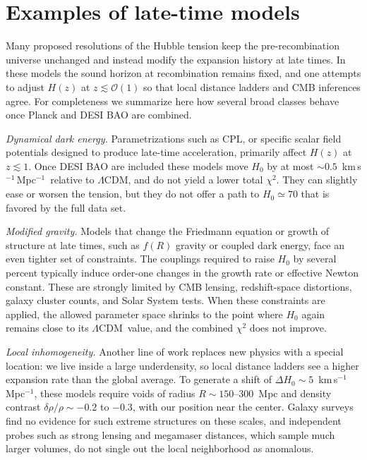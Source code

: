 \documentclass[onecolumn,showpacs,preprintnumbers,amsmath,amssymb,prd]{revtex4-2}
\newcommand{\lcdm}{$\Lambda$CDM}
\newcommand{\kms}{km\,s$^{-1}$\,Mpc$^{-1}$}
\begin{document}


\appendix

\section{Examples of late-time models}
\label{app:latetime}

Many proposed resolutions of the Hubble tension keep the pre-recombination universe 
unchanged and instead modify the expansion history at late times. In these models 
the sound horizon at recombination remains fixed, and one attempts to adjust $H(z)$ 
at $z \lesssim \mathcal{O}(1)$ so that local distance ladders and CMB inferences agree. 
For completeness we summarize here how several broad classes behave once Planck and 
DESI BAO are combined.

\emph{Dynamical dark energy.} Parametrizations such as CPL, or specific scalar 
field potentials designed to produce late-time acceleration, primarily affect 
$H(z)$ at $z \lesssim 1$. Once DESI BAO 
are included these models move $H_0$ by at most $\sim 0.5$~\kms\ 
relative to \lcdm, and do not yield a lower total $\chi^2$. They can slightly ease 
or worsen the tension, but they do not offer a path to $H_0 \simeq 70$ that is 
favored by the full data set.

\emph{Modified gravity.} Models that change the Friedmann equation or growth of 
structure at late times, such as $f(R)$ gravity or coupled dark energy, face an 
even tighter set of constraints. The couplings required to raise $H_0$ by several 
percent typically induce order-one changes in the growth rate or effective Newton 
constant. These are strongly limited by CMB lensing, redshift-space distortions, 
galaxy cluster counts, and Solar System tests. When these constraints are applied, 
the allowed parameter space shrinks to the point where $H_0$ again remains close 
to its \lcdm\ value, and the combined $\chi^2$ does not improve.

\emph{Local inhomogeneity.} Another line of work replaces new physics with a 
special location: we live inside a large underdensity, so local distance ladders 
see a higher expansion rate than the global average. To generate a shift of 
$\Delta H_0 \sim 5$~\kms, these models require voids of radius 
$R \sim 150$--300~Mpc and density contrast $\delta\rho/\rho \sim -0.2$ to $-0.3$, 
with our position near the center. Galaxy surveys find no evidence for such extreme 
structures on these scales, and independent probes such as strong lensing and 
megamaser distances, which sample much larger volumes, do not single out the local 
neighborhood as anomalous.
\end{document}
